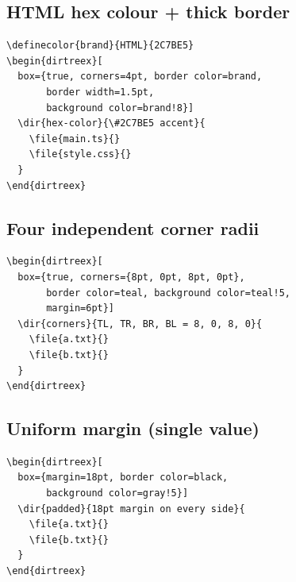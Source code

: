 \documentclass[11pt]{article}
\begin{document}
\subsection{HTML hex colour + thick border}

\begin{Verbatim}
\definecolor{brand}{HTML}{2C7BE5}
\begin{dirtreex}[
  box={true, corners=4pt, border color=brand,
       border width=1.5pt,
       background color=brand!8}]
  \dir{hex-color}{\#2C7BE5 accent}{
    \file{main.ts}{}
    \file{style.css}{}
  }
\end{dirtreex}
\end{Verbatim}

\begin{dirtreex}[
  box={true, corners=4pt, border color=brand,
       border width=1.5pt,
       background color=brand!8}]
\end{dirtreex}

\subsection{Four independent corner radii}

\begin{Verbatim}
\begin{dirtreex}[
  box={true, corners={8pt, 0pt, 8pt, 0pt},
       border color=teal, background color=teal!5,
       margin=6pt}]
  \dir{corners}{TL, TR, BR, BL = 8, 0, 8, 0}{
    \file{a.txt}{}
    \file{b.txt}{}
  }
\end{dirtreex}
\end{Verbatim}

\begin{dirtreex}[
  box={true, corners={8pt, 0pt, 8pt, 0pt},
       border color=teal, background color=teal!5,
       margin=6pt}]
\end{dirtreex}

\subsection{Uniform margin (single value)}

\begin{Verbatim}
\begin{dirtreex}[
  box={margin=18pt, border color=black,
       background color=gray!5}]
  \dir{padded}{18pt margin on every side}{
    \file{a.txt}{}
    \file{b.txt}{}
  }
\end{dirtreex}
\end{Verbatim}
\end{document}
